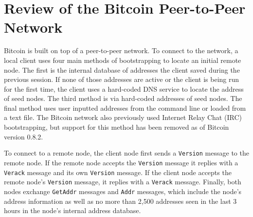 \section{Review of the Bitcoin Peer-to-Peer Network}
Bitcoin is built on top of a peer-to-peer network. To connect to the network, a local client uses four main methods of bootstrapping to locate an initial remote node.  The first is the internal database of addresses the client saved during the previous session.  If none of those addresses are active or the client is being run for the first time, the client uses a hard-coded DNS service to locate the address of seed nodes.   The third method is via hard-coded addresses of seed nodes.  The final method uses user inputted addresses from the command line or loaded from a text file.  The Bitcoin network also previously used Internet Relay Chat (IRC) bootstrapping, but support for this method has been removed as of Bitcoin version 0.8.2.

To connect to a remote node, the client node first sends a {\tt Version} message to the remote node. If the remote node accepts the {\tt Version} message it replies with a {\tt Verack} message and its own {\tt Version} message. If the client node accepts the remote node's {\tt Version} message, it replies with a {\tt Verack} message.  Finally, both nodes exchange {\tt GetAddr} messages and {\tt Addr} messages, which include the node's address information as well as no more than 2,500 addresses seen in the last 3 hours in the node's internal address database.

